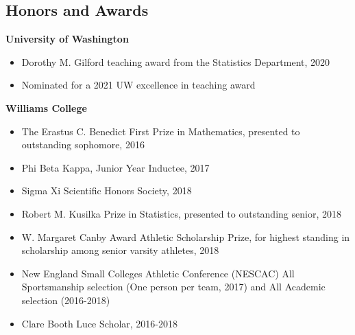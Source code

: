 \documentclass[margin, 10pt]{res} %
\begin{document}
\begin{resume}
{%


\section{Honors and Awards}
{\textbf{University of Washington}}
\begin{itemize}
\item Dorothy M. Gilford teaching award from the Statistics Department, 2020
\item Nominated for a 2021 UW excellence in teaching award
\end{itemize}
{\textbf{Williams College}}
\begin{itemize}
\item The Erastus C. Benedict First Prize in Mathematics, presented to outstanding sophomore, 2016
\item Phi Beta Kappa, Junior Year Inductee, 2017
\item Sigma Xi Scientific Honors Society, 2018
\item Robert M. Kusilka Prize in Statistics, presented to outstanding senior, 2018
\item W. Margaret Canby Award Athletic Scholarship Prize, for highest standing in scholarship among senior varsity athletes, 2018
\item New England Small Colleges Athletic Conference (NESCAC) All Sportsmanship selection (One person per team, 2017) and All Academic selection (2016-2018)
\item Clare Booth Luce Scholar, 2016-2018
\end{itemize}

}
\end{resume}
\end{document}

